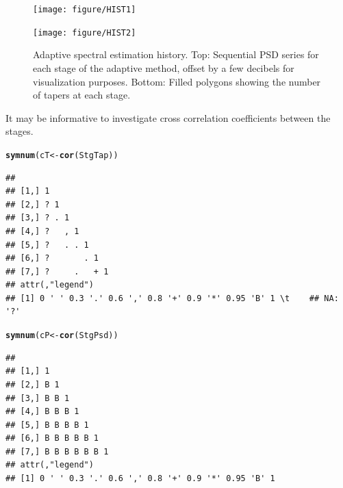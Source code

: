 \documentclass{article}\usepackage{graphicx, color}
\makeatletter
\newcommand{\hlfunctioncall}[1]{\textcolor[rgb]{0.501960784313725,0,0.329411764705882}{\textbf{#1}}}%
\newenvironment{kframe}{%
 \def\at@end@of@kframe{}%
 \ifinner\ifhmode%
  \def\at@end@of@kframe{\end{minipage}}%
  \begin{minipage}{\columnwidth}%
 \fi\fi%
 \def\FrameCommand##1{\hskip\@totalleftmargin \hskip-\fboxsep
 \colorbox{shadecolor}{##1}\hskip-\fboxsep
     \hskip-\linewidth \hskip-\@totalleftmargin \hskip\columnwidth}%
 \MakeFramed {\advance\hsize-\width
   \@totalleftmargin\z@ \linewidth\hsize
   \@setminipage}}%
 {\par\unskip\endMakeFramed%
 \at@end@of@kframe}
\newenvironment{knitrout}{}{} %
\makeatother
\begin{document}
\begin{figure}[htb!]
\begin{center}
\begin{knitrout}
\color{fgcolor}
\texttt{[image: figure/HIST1]} 

\end{knitrout}

\begin{knitrout}
\color{fgcolor}
\texttt{[image: figure/HIST2]} 

\end{knitrout}

\caption{Adaptive spectral estimation history.
Top: Sequential PSD series for each stage of the adaptive method, 
offset by a few decibels for visualization purposes.
Bottom: Filled polygons showing the number of tapers at each stage.
}
\label{fig:psdhist}
\end{center}
\end{figure}

It may be informative to investigate cross correlation
coefficients between the stages.
\begin{knitrout}
\color{fgcolor}\begin{kframe}
\begin{alltt}
\hlfunctioncall{symnum}(cT <- \hlfunctioncall{cor}(StgTap))
\end{alltt}


{\ttfamily\noindent\color{warningcolor}{\#\# Warning: the standard deviation is zero}}\begin{verbatim}
##                   
## [1,] 1            
## [2,] ? 1          
## [3,] ? . 1        
## [4,] ?   , 1      
## [5,] ?   . . 1    
## [6,] ?       . 1  
## [7,] ?     .   + 1
## attr(,"legend")
## [1] 0 ' ' 0.3 '.' 0.6 ',' 0.8 '+' 0.9 '*' 0.95 'B' 1 \t    ## NA: '?'
\end{verbatim}
\end{kframe}
\end{knitrout}

\begin{knitrout}
\color{fgcolor}\begin{kframe}
\begin{alltt}
\hlfunctioncall{symnum}(cP <- \hlfunctioncall{cor}(StgPsd))
\end{alltt}
\begin{verbatim}
##                   
## [1,] 1            
## [2,] B 1          
## [3,] B B 1        
## [4,] B B B 1      
## [5,] B B B B 1    
## [6,] B B B B B 1  
## [7,] B B B B B B 1
## attr(,"legend")
## [1] 0 ' ' 0.3 '.' 0.6 ',' 0.8 '+' 0.9 '*' 0.95 'B' 1
\end{verbatim}
\end{kframe}
\end{knitrout}
\end{document}
